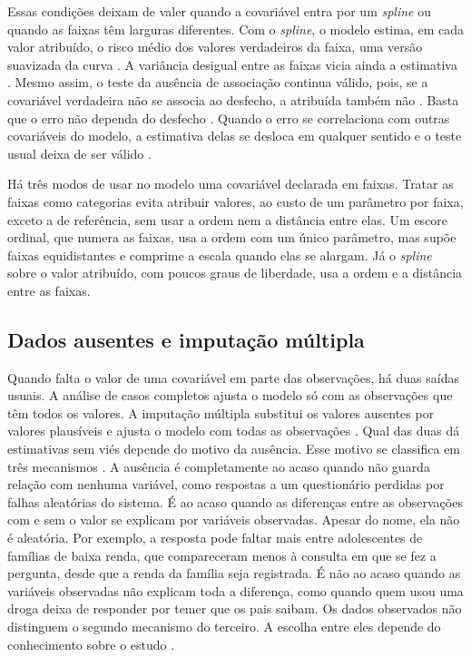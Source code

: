\documentclass[12pt,a4paper]{article}
\begin{document}
Essas condições deixam de valer quando a covariável entra por um \textit{spline} ou quando as faixas têm larguras diferentes. Com o \textit{spline}, o modelo estima, em cada valor atribuído, o risco médio dos valores verdadeiros da faixa, uma versão suavizada da curva \citep[p.~318]{carroll2006measurement}. A variância desigual entre as faixas vicia ainda a estimativa \citep[pp.~80--81]{carroll2006measurement}. Mesmo assim, o teste da ausência de associação continua válido, pois, se a covariável verdadeira não se associa ao desfecho, a atribuída também não \citep[pp.~248--250]{carroll2006measurement}. Basta que o erro não dependa do desfecho \citep[p.~36]{carroll2006measurement}. Quando o erro se correlaciona com outras covariáveis do modelo, a estimativa delas se desloca em qualquer sentido e o teste usual deixa de ser válido \citep{keogh2020stratos}.

Há três modos de usar no modelo uma covariável declarada em faixas. Tratar as faixas como categorias evita atribuir valores, ao custo de um parâmetro por faixa, exceto a de referência, sem usar a ordem nem a distância entre elas. Um escore ordinal, que numera as faixas, usa a ordem com um único parâmetro, mas supõe faixas equidistantes e comprime a escala quando elas se alargam. Já o \textit{spline} sobre o valor atribuído, com poucos graus de liberdade, usa a ordem e a distância entre as faixas.

\subsection{Dados ausentes e imputação múltipla}
\label{sec:fund-ausentes}

Quando falta o valor de uma covariável em parte das observações, há duas saídas usuais. A análise de casos completos ajusta o modelo só com as observações que têm todos os valores. A imputação múltipla substitui os valores ausentes por valores plausíveis e ajusta o modelo com todas as observações \citep[p.~3]{hughes2019accounting}. Qual das duas dá estimativas sem viés depende do motivo da ausência. Esse motivo se classifica em três mecanismos \citep[p.~3]{hughes2019accounting}. A ausência é completamente ao acaso quando não guarda relação com nenhuma variável, como respostas a um questionário perdidas por falhas aleatórias do sistema. É ao acaso quando as diferenças entre as observações com e sem o valor se explicam por variáveis observadas. Apesar do nome, ela não é aleatória. Por exemplo, a resposta pode faltar mais entre adolescentes de famílias de baixa renda, que compareceram menos à consulta em que se fez a pergunta, desde que a renda da família seja registrada. É não ao acaso quando as variáveis observadas não explicam toda a diferença, como quando quem usou uma droga deixa de responder por temer que os pais saibam. Os dados observados não distinguem o segundo mecanismo do terceiro. A escolha entre eles depende do conhecimento sobre o estudo \citep[p.~2]{hughes2019accounting}.
\end{document}
